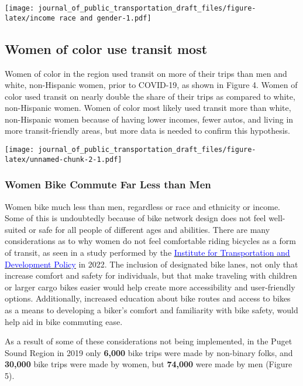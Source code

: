 \documentclass[
  12pt,
]{article}
\begin{document}
\texttt{[image: journal\_of\_public\_transportation\_draft\_files/figure-latex/income race and gender-1.pdf]}

\hypertarget{women-of-color-use-transit-most}{%
\subsection{Women of color use transit
most}\label{women-of-color-use-transit-most}}

Women of color in the region used transit on more of their trips than
men and white, non-Hispanic women, prior to COVID-19, as shown in Figure
4. Women of color used transit on nearly double the share of their trips
as compared to white, non-Hispanic women. Women of color most likely
used transit more than white, non-Hispanic women because of having lower
incomes, fewer autos, and living in more transit-friendly areas, but
more data is needed to confirm this hypothesis.

\texttt{[image: journal\_of\_public\_transportation\_draft\_files/figure-latex/unnamed-chunk-2-1.pdf]}

\hypertarget{women-bike-commute-far-less-than-men}{%
\subsubsection{Women Bike Commute Far Less than
Men}\label{women-bike-commute-far-less-than-men}}

\begin{flushleft}
Women bike much less than men, regardless or race and ethnicity or income. Some of this is undoubtedly because of bike network design does not feel well-suited or safe for all people of different ages and abilities. There are many considerations as to why women do not feel comfortable riding bicycles as a form of transit, as seen in a study performed by the \href{https://www.itdp.org/2022/07/06/cyclings-gender-gap/}{\underline{\textcolor{blue}{Institute for Transportation and Development Policy}}} in 2022. The inclusion of designated bike lanes, not only that increase comfort and safety for individuals, but that make traveling with children or larger cargo bikes easier would help create more accessibility and user-friendly options. Additionally, increased education about bike routes and access to bikes as a means to developing a biker's comfort and familiarity with bike safety, would help aid in bike commuting ease. 

As a result of some of these considerations not being implemented, in the Puget Sound Region in 2019 only \textbf{6,000} bike trips were made by non-binary folks, and \textbf{30,000} bike trips were made by women, but \textbf{74,000} were made by men (Figure 5). 
\end{flushleft}
\end{document}

